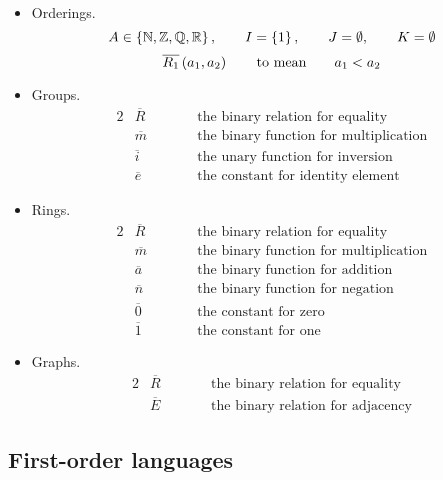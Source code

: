 \pagebreak

\begin{example1}
\label{eg:2.1.3}
\hfill
\begin{itemize}
\item Orderings.
$$ A \in \left\{ \mathbb{N}, \mathbb{Z}, \mathbb{Q}, \mathbb{R} \right\}, \qquad I = \left\{ 1 \right\}, \qquad J = \emptyset, \qquad K = \emptyset $$
$$ \overline{R_1}\left( a_1, a_2 \right) \qquad \text{to mean} \qquad a_1 < a_2 $$
\item Groups.
\begin{alignat*}{2}
& \overline{R} & \qquad & \text{the binary relation for equality} \\
& \overline{m} & \qquad & \text{the binary function for multiplication} \\
& \overline{i} & \qquad & \text{the unary function for inversion} \\
& \overline{e} & \qquad & \text{the constant for identity element}
\end{alignat*}
\item Rings.
\begin{alignat*}{2}
& \overline{R} & \qquad & \text{the binary relation for equality} \\
& \overline{m} & \qquad & \text{the binary function for multiplication} \\
& \overline{a} & \qquad & \text{the binary function for addition} \\
& \overline{n} & \qquad & \text{the binary function for negation} \\
& \overline{0} & \qquad & \text{the constant for zero} \\
& \overline{1} & \qquad & \text{the constant for one}
\end{alignat*}
\item Graphs.
\begin{alignat*}{2}
& \overline{R} & \qquad & \text{the binary relation for equality} \\
& \overline{E} & \qquad & \text{the binary relation for adjacency}
\end{alignat*}
\end{itemize}
\end{example1}

\subsection{First-order languages}

